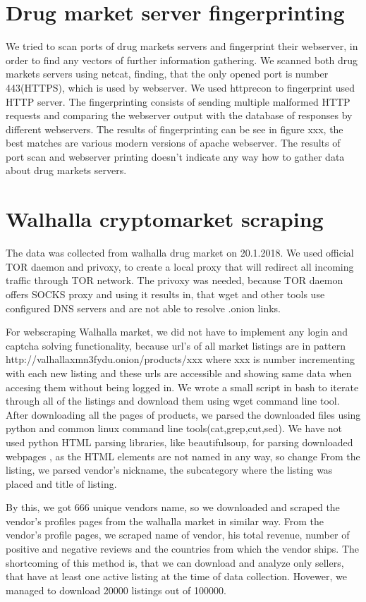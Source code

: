 \documentclass[
  digital, %
  table,   %
  lof,     %
  lot,     %
  oneside
]{fithesis3}
\begin{document}
\section{Drug market server fingerprinting}
We tried to scan ports of drug markets servers and fingerprint their webserver, in order to find any vectors of further information gathering.
We scanned both drug markets servers using netcat, finding, that the only opened port is number 443(HTTPS), which is used by webserver.
We used httprecon to fingerprint used HTTP server. The fingerprinting consists of sending multiple malformed HTTP requests and comparing the webserver output with the database of responses by different webservers.
The results of fingerprinting can be see in figure xxx, the best matches are various modern versions of apache webserver.
The results of port scan and webserver printing doesn't indicate any way how to gather data about drug markets servers.

\section{Walhalla cryptomarket scraping}
The data was collected from walhalla drug market on 20.1.2018.
We used official TOR daemon and privoxy, to create a local proxy that will redirect all
incoming traffic through TOR network. The privoxy was needed, because TOR 
daemon offers SOCKS proxy and using it results in, that wget and other tools use 
configured DNS servers and are not able to resolve .onion links.

For webscraping Walhalla market, we did not have to implement any login and captcha solving functionality,
because url's of all market listings are in pattern http://valhallaxmn3fydu.onion/products/xxx where 
xxx is number incrementing with each new listing and these urls are accessible and showing same data when 
accesing them without being logged in.
We wrote a small script in bash to iterate through all of the listings and download them using wget command line tool.
After downloading all the pages of products, we parsed the downloaded files using python and common linux command 
line tools(cat,grep,cut,sed). We have not used python HTML parsing libraries, like beautifulsoup, for parsing downloaded
webpages , as the HTML elements
are not named in any way, so change 
From the listing, we parsed vendor's nickname, the subcategory where the listing was placed and title of listing.

By this, we got 666 unique vendors name, so we downloaded and scraped the vendor's profiles pages from the walhalla 
market in similar way.
From the vendor's profile pages, we scraped name of vendor, his total revenue, number of positive and negative reviews 
and the countries from which the vendor ships.
The shortcoming of this method is, that we can download and analyze only sellers, 
that have at least one active listing at the time of data collection. 
Hovewer, we managed to download 20000 listings out of 100000.
\end{document}
